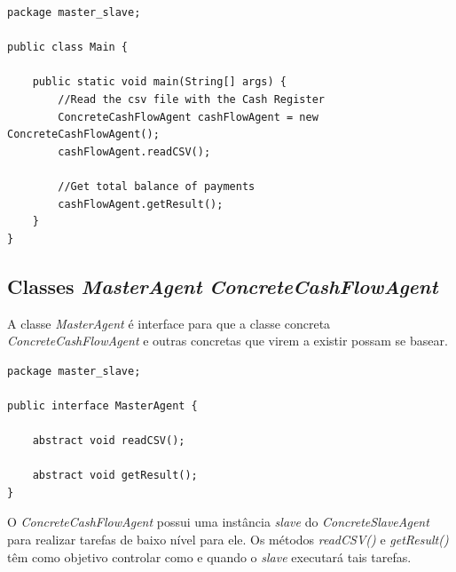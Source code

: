 \begin{lstlisting}
package master_slave;

public class Main {
	
	public static void main(String[] args) {
		//Read the csv file with the Cash Register
		ConcreteCashFlowAgent cashFlowAgent = new ConcreteCashFlowAgent();
		cashFlowAgent.readCSV();
		
		//Get total balance of payments
		cashFlowAgent.getResult();
	}
}
\end{lstlisting}

\subsection{Classes \textit{MasterAgent} \textit{ConcreteCashFlowAgent}}

A classe \textit{MasterAgent} é interface para que a classe concreta \textit{ConcreteCashFlowAgent} e outras concretas que virem a existir possam se basear.

\begin{lstlisting}
package master_slave;

public interface MasterAgent {

	abstract void readCSV();
	
	abstract void getResult();
}
\end{lstlisting}

O \textit{ConcreteCashFlowAgent} possui uma instância \textit{slave} do \textit{ConcreteSlaveAgent} para realizar tarefas de baixo nível para ele. Os métodos \textit{readCSV()} e \textit{getResult()} têm como objetivo controlar como e quando o \textit{slave} executará tais tarefas.

